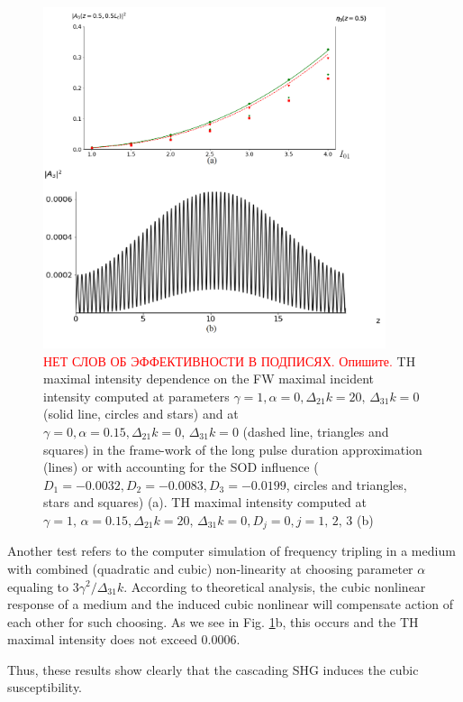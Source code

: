 \documentclass[a4paper, 12pt, onecolumn]{extarticle}
\begin{document}
\begin{figure}[h!] 
\centering 
\includegraphics[height=10cm, width=0.7\linewidth]{CascadeF}  
\caption{ \textcolor{red}{НЕТ СЛОВ ОБ ЭФФЕКТИВНОСТИ В ПОДПИСЯХ. Опишите.}  TH maximal intensity dependence on the FW maximal incident intensity computed at parameters \(\gamma=1,\alpha=0,\Delta_{21}k=20,\,\Delta_{31}k=0\) (solid line, circles and stars) and at \(\gamma=0,\alpha=0.15,\Delta_{21}k=0,\,\Delta_{31}k=0\) (dashed line, triangles and squares) in the frame-work of the long pulse duration approximation (lines) or with accounting for the   SOD influence (\(D_1=-0.0032, D_2 =  -0.0083, D_3 =  -0.0199\), circles and triangles, stars and squares) (a). TH maximal intensity computed at $\gamma=1,\,\alpha=0.15,\Delta_{21}k=20,\,\Delta_{31}k=0,D_j=0,j=1,\,2,\,3$ (b)}
\label{fr:f}
\end{figure}

Another test refers to the computer simulation of frequency tripling in a medium with combined (quadratic and cubic) non-linearity at choosing parameter $\alpha$ equaling to $3\gamma^2/\Delta_{31}k$. According to theoretical analysis, the cubic nonlinear response of a medium and the induced cubic nonlinear will compensate action of each other for such choosing. As we see in Fig. \ref{fr:f}b, this occurs and the TH maximal intensity does not exceed $0.0006$. 

Thus, these results show clearly that the cascading SHG induces the cubic susceptibility. 
\end{document}
